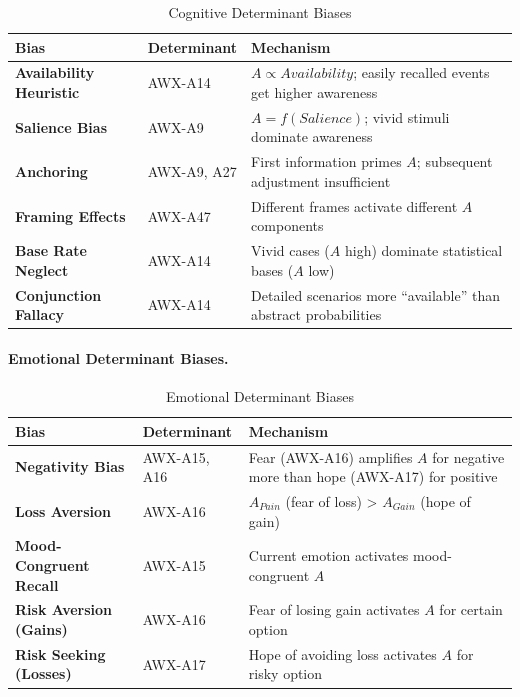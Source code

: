 \begin{table}[htbp]
\centering
\caption{Cognitive Determinant Biases}
\label{tab:cognitive-biases}
\renewcommand{\arraystretch}{1.4}
\begin{tabular}{@{}llp{5.5cm}@{}}
\toprule
\textbf{Bias} & \textbf{Determinant} & \textbf{Mechanism} \\
\midrule
\textbf{Availability Heuristic} & AWX-A14 & $A \propto Availability$; easily recalled events get higher awareness \\
\textbf{Salience Bias} & AWX-A9 & $A = f(Salience)$; vivid stimuli dominate awareness \\
\textbf{Anchoring} & AWX-A9, A27 & First information primes $A$; subsequent adjustment insufficient \\
\textbf{Framing Effects} & AWX-A47 & Different frames activate different $A$ components \\
\textbf{Base Rate Neglect} & AWX-A14 & Vivid cases ($A$ high) dominate statistical bases ($A$ low) \\
\textbf{Conjunction Fallacy} & AWX-A14 & Detailed scenarios more ``available'' than abstract probabilities \\
\bottomrule
\end{tabular}
\end{table}

\paragraph{Emotional Determinant Biases.}

\begin{table}[htbp]
\centering
\caption{Emotional Determinant Biases}
\label{tab:emotional-biases}
\renewcommand{\arraystretch}{1.4}
\begin{tabular}{@{}llp{5.5cm}@{}}
\toprule
\textbf{Bias} & \textbf{Determinant} & \textbf{Mechanism} \\
\midrule
\textbf{Negativity Bias} & AWX-A15, A16 & Fear (AWX-A16) amplifies $A$ for negative more than hope (AWX-A17) for positive \\
\textbf{Loss Aversion} & AWX-A16 & $A_{Pain}$ (fear of loss) > $A_{Gain}$ (hope of gain) \\
\textbf{Mood-Congruent Recall} & AWX-A15 & Current emotion activates mood-congruent $A$ \\
\textbf{Risk Aversion (Gains)} & AWX-A16 & Fear of losing gain activates $A$ for certain option \\
\textbf{Risk Seeking (Losses)} & AWX-A17 & Hope of avoiding loss activates $A$ for risky option \\
\bottomrule
\end{tabular}
\end{table}

